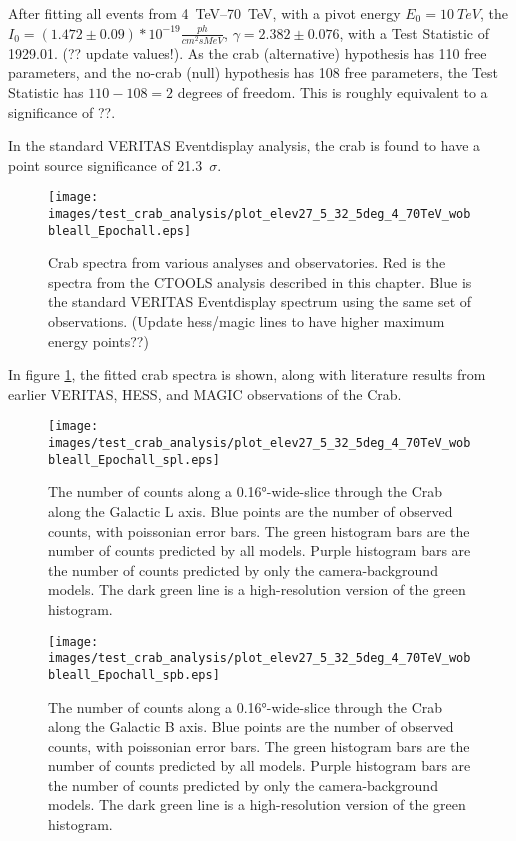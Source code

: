     After fitting all events from \SIrange{4}{70}{TeV}, with a pivot energy $ E_{0}= \SI{10}{TeV} $, the $ I_{0} = \left(1.472\pm0.09\right)*10^{-19} \frac{ph}{cm^{2} s MeV} $, $ \gamma = 2.382 \pm 0.076 $, with a Test Statistic of 1929.01. {\color{red}(?? update values!)}.
    As the crab (alternative) hypothesis has 110 free parameters, and the no-crab (null) hypothesis has 108 free parameters, the Test Statistic has $ 110 - 108 = 2 $ degrees of freedom.
    This is roughly equivalent to a {\color{red}significance of ??}.
    
    In the standard VERITAS Eventdisplay analysis, the crab is found to have a point source significance of \SI{21.3}{$\sigma$}.
    
    
    \begin{figure}[h]
      \centering
      \texttt{[image: images/test\_crab\_analysis/plot\_elev27\_5\_32\_5deg\_4\_70TeV\_wobbleall\_Epochall.eps]}
      \caption[Crab Test Spectrum]
      {
        Crab spectra from various analyses and observatories.
        Red is the spectra from the CTOOLS analysis described in this chapter.
        Blue is the standard VERITAS Eventdisplay spectrum using the same set of observations.
        {\color{red}(Update hess/magic lines to have higher maximum energy points??)}
      }
      \label{fig:crab_test_spectra}
    \end{figure}
    
    In figure \ref{fig:crab_test_spectra}, the fitted crab spectra is shown, along with literature results from earlier VERITAS, HESS, and MAGIC observations of the Crab.
    
    \begin{figure}[h]
      \centering
      \texttt{[image: images/test\_crab\_analysis/plot\_elev27\_5\_32\_5deg\_4\_70TeV\_wobbleall\_Epochall\_spl.eps]}
      \caption[Crab Profile along Galactic L]
      {
        The number of counts along a \ang{0.16}-wide-slice through the Crab along the Galactic L axis.
        Blue points are the number of observed counts, with poissonian error bars.
        The green histogram bars are the number of counts predicted by all models.
        Purple histogram bars are the number of counts predicted by only the camera-background models.
        The dark green line is a high-resolution version of the green histogram.
      }
      \label{fig:crab_profile_l}
    \end{figure}

    \begin{figure}[h]
      \centering
      \texttt{[image: images/test\_crab\_analysis/plot\_elev27\_5\_32\_5deg\_4\_70TeV\_wobbleall\_Epochall\_spb.eps]}
      \caption[Crab Profile along Galactic B]
      {
        The number of counts along a \ang{0.16}-wide-slice through the Crab along the Galactic B axis.
        Blue points are the number of observed counts, with poissonian error bars.
        The green histogram bars are the number of counts predicted by all models.
        Purple histogram bars are the number of counts predicted by only the camera-background models.
        The dark green line is a high-resolution version of the green histogram.
      }
      \label{fig:crab_profile_b}
    \end{figure}
    
